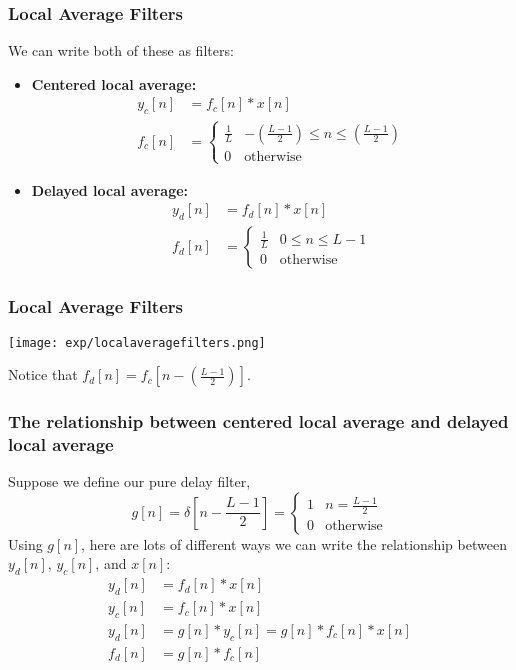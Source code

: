 \documentclass{beamer}
\begin{document}
\begin{frame}
  \frametitle{Local Average Filters}

  We can write both of these as filters:
  \begin{itemize}
  \item {\bf Centered local average:}
    \begin{align*}
      y_c[n] &= f_c[n]\ast x[n]\\
      f_c[n] &= \begin{cases} \frac{1}{L}& -\left(\frac{L-1}{2}\right)\le n\le\left(\frac{L-1}{2}\right)\\
        0&\mbox{otherwise}\end{cases}
    \end{align*}
  \item {\bf Delayed local average:}
    \begin{align*}
      y_d[n] &= f_d[n]\ast x[n]\\
      f_d[n] &= \begin{cases} \frac{1}{L}& 0\le n\le L-1\\
        0&\mbox{otherwise}\end{cases}
    \end{align*}
  \end{itemize}
\end{frame}

\begin{frame}
  \frametitle{Local Average Filters}
  \centerline{\texttt{[image: exp/localaveragefilters.png]}}
  Notice that $f_d[n]=f_c\left[n-\left(\frac{L-1}{2}\right)\right]$.
\end{frame}  

\begin{frame}
  \frametitle{The relationship between centered local average and delayed local average}

  Suppose we define our pure delay filter,
  \[
  g[n]=\delta\left[n-\frac{L-1}{2}\right] = \begin{cases}
  1 & n=\frac{L-1}{2}\\
  0 & \mbox{otherwise}
  \end{cases}
  \]
  Using $g[n]$, here are  lots of different ways we can write the relationship
  between $y_d[n]$, $y_c[n]$, and $x[n]$:
  \begin{align*}
    y_d[n] &= f_d[n]\ast x[n]\\
    y_c[n] &= f_c[n]\ast x[n]\\
    y_d[n] &= g[n]\ast y_c[n] = g[n]\ast f_c[n]\ast x[n]\\
    f_d[n] &= g[n]\ast f_c[n]
  \end{align*}
\end{frame}
  
\end{document}

